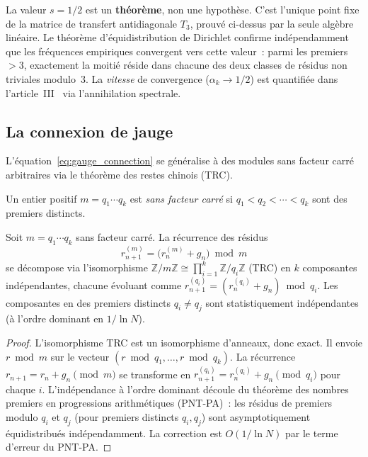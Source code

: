 \documentclass[12pt,a4paper]{article}
\begin{document}
\begin{remarque}[Épistémique de $s = 1/2$]
\label{rem:s_half}
La valeur $s = 1/2$ est un \textbf{théorème}, non une hypothèse.
C'est l'unique point fixe de la matrice de transfert antidiagonale
$T_3$, prouvé ci-dessus par la seule algèbre linéaire. Le théorème
d'équidistribution de Dirichlet confirme indépendamment que les
fréquences empiriques convergent vers cette valeur~: parmi les
premiers $> 3$, exactement la moitié réside dans chacune des deux
classes de résidus non triviales modulo~3. La \emph{vitesse} de
convergence ($\alpha_k \to 1/2$) est quantifiée dans
l'article~III~\cite{companion_M3} via l'annihilation spectrale.
\end{remarque}

\subsection{La connexion de jauge}
\label{sec:gauge}

L'équation~\eqref{eq:gauge_connection} se généralise à des modules
sans facteur carré arbitraires via le théorème des restes chinois
(TRC).

\begin{definition}
Un entier positif $m = q_1 \cdots q_k$ est \emph{sans facteur carré}
si $q_1 < q_2 < \cdots < q_k$ sont des premiers distincts.
\end{definition}

\mTHM
\begin{theoreme}
\label{thm:gauge}
Soit $m = q_1 \cdots q_k$ sans facteur carré. La récurrence des
résidus
\[
  r_{n+1}^{(m)} = \bigl(r_n^{(m)} + g_n\bigr) \bmod m
\]
se décompose via l'isomorphisme $\mathbb{Z}/m\mathbb{Z} \cong
\prod_{i=1}^k \mathbb{Z}/q_i\mathbb{Z}$ (TRC) en $k$ composantes
indépendantes, chacune évoluant comme
$r_{n+1}^{(q_i)} = (r_n^{(q_i)} + g_n) \bmod q_i$. Les composantes en
des premiers distincts $q_i \neq q_j$ sont statistiquement
indépendantes (à l'ordre dominant en $1/\ln N$).
\end{theoreme}

\begin{proof}
L'isomorphisme TRC est un isomorphisme d'anneaux, donc exact. Il
envoie $r \bmod m$ sur le vecteur $(r \bmod q_1, \ldots, r \bmod q_k)$.
La récurrence $r_{n+1} = r_n + g_n \pmod m$ se transforme en
$r_{n+1}^{(q_i)} = r_n^{(q_i)} + g_n \pmod{q_i}$ pour chaque $i$.
L'indépendance à l'ordre dominant découle du théorème des nombres
premiers en progressions arithmétiques (PNT-PA)~: les résidus de
premiers modulo $q_i$ et $q_j$ (pour premiers distincts $q_i, q_j$)
sont asymptotiquement équidistribués indépendamment. La correction est
$O(1/\ln N)$ par le terme d'erreur du PNT-PA.
\end{proof}
\end{document}
